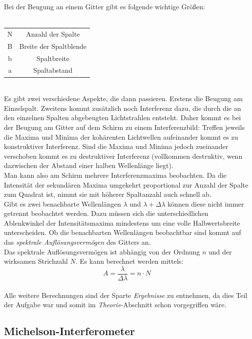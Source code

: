 \documentclass{article}
\begin{document}
Bei der Beugung an einem Gitter gibt es folgende wichtige Größen:\\
\\
\begin{tabular}{|c|c|}
\hline
N & Anzahl der Spalte\\
B & Breite der Spaltblende\\
b & Spaltbreite\\
a & Spaltabstand\\
\hline
\end{tabular}
\vspace{0.5cm}
\\
Es gibt zwei verschiedene Aspekte, die dann passieren. Erstens die Beugung am Einzelspalt. Zweitens kommt zusätzlich noch Interferenz dazu, die durch die an den einzelnen Spalten abgebeugten Lichtstrahlen entsteht. Daher kommt es bei der Beugung am Gitter auf dem Schirm zu einem Interferenzbild: Treffen jeweils die Maxima und Minima der kohärenten Lichtwellen aufeinander kommt es zu konstruktiver Interferenz. Sind die Maxima und Minima jedoch zueinander verschoben kommt es zu destruktiver Interferenz (vollkommen destruktiv, wenn dazwischen der Abstand einer halben Wellenlänge liegt).\\
Man kann also am Schirm mehrere Interferenzmaxima beobachten. Da die Intensität der sekundären Maxima umgekehrt proportional zur Anzahl der Spalte zum Quadrat ist, nimmt sie mit höherer Spaltanzahl auch schnell ab.\\
Gibt es zwei benachbarte Wellenlängen $\lambda$ und $\lambda+\Delta\lambda$ können diese nicht immer getrennt beobachtet werden. Dazu müssen sich die unterschiedlichen Ablenkwinkel der Intensitätsmaxima mindestens um eine volle Halbwertsbreite unterscheiden. Ob die benachbarten Wellenlängen beobachtbar sind kommt auf das \textit{spektrale Auflösungsvermögen} des Gitters an.\\
Das spektrale Auflösungsvermögen ist abhängig von der Ordnung $n$ und der wirksamen Strichzahl $N$. Es kann berechnet werden mittels:
$$A=\frac{\lambda}{\Delta\lambda}=n\cdot N$$
\\
Alle weitere Berechnungen sind der Sparte \textit{Ergebnisse} zu entnehmen, da dies Teil der Aufgabe war und somit im \textit{Theorie}-Abschnitt schon vorgegriffen wäre.


\subsection{}

\subsection{Michelson-Interferometer}
\end{document}
